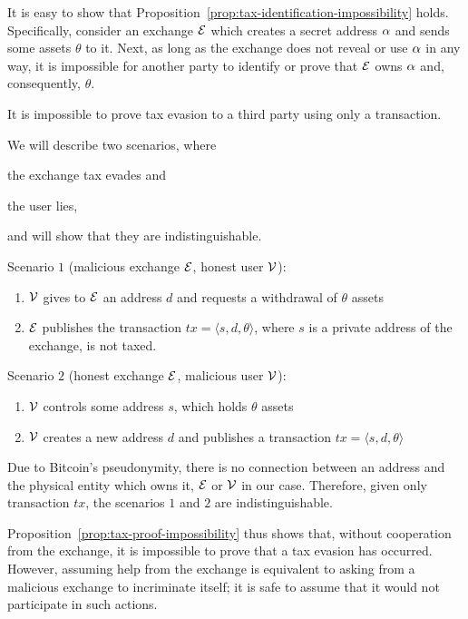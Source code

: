 It is easy to show that Proposition~\ref{prop:tax-identification-impossibility}
holds. Specifically, consider an exchange $\mathcal{E}$ which creates a secret
address $\alpha$ and sends some assets $\theta$ to it. Next, as long as the
exchange does not reveal or use $\alpha$ in any way, it is impossible for
another party to identify or prove that $\mathcal{E}$ owns $\alpha$ and,
consequently, $\theta$.

\begin{proposition}\label{prop:tax-proof-impossibility}
    It is impossible to prove tax evasion to a third party using only a
    transaction.
\end{proposition}
We will describe two scenarios, where
\begin{inparaenum}[i)]
    \item the exchange tax evades and
    \item the user lies,
\end{inparaenum}
and will show that they are indistinguishable.

Scenario $1$ (malicious exchange $\mathcal{E}$, honest user $\mathcal{V}$):
\begin{enumerate}
    \item $\mathcal{V}$ gives to $\mathcal{E}$ an address $d$ and requests a
        withdrawal of $\theta$ assets
    \item $\mathcal{E}$ publishes the transaction $tx = \langle s, d, \theta
        \rangle$, where $s$ is a private address of the exchange, \ie is
        not taxed.
\end{enumerate}

Scenario $2$ (honest exchange $\mathcal{E}$, malicious user $\mathcal{V}$):
\begin{enumerate}
    \item $\mathcal{V}$ controls some address $s$, which holds $\theta$ assets
    \item $\mathcal{V}$ creates a new address $d$ and publishes a transaction
        $tx = \langle s, d, \theta \rangle$
\end{enumerate}

Due to Bitcoin's pseudonymity, there is no connection between an address
and the physical entity which owns it, \ie $\mathcal{E}$ or $\mathcal{V}$ in our
case. Therefore, given only transaction $tx$, the scenarios $1$ and $2$ are
indistinguishable.

Proposition~\ref{prop:tax-proof-impossibility} thus shows that, without
cooperation from the exchange, it is impossible to prove that a tax evasion has
occurred. However, assuming help from the exchange is equivalent to asking
from a malicious exchange to incriminate itself; it is safe to assume that it
would not participate in such actions.

